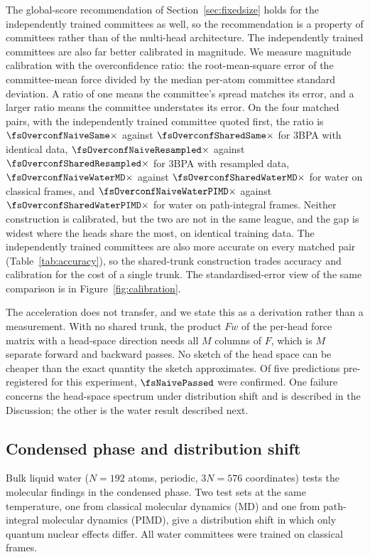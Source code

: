 The global-score recommendation of Section~\ref{sec:fixedsize} holds for the
independently trained committees as well, so the recommendation is a property
of committees rather than of the multi-head architecture. The independently
trained committees are also far better calibrated in magnitude. We measure
magnitude calibration with the overconfidence ratio: the root-mean-square error
of the committee-mean force divided by the median per-atom committee standard
deviation. A ratio of one means the committee's spread matches its error, and a
larger ratio means the committee understates its error. On the four matched
pairs, with the independently trained committee quoted first, the ratio is
$\fsOverconfNaiveSame\times$ against $\fsOverconfSharedSame\times$ for 3BPA
with identical data, $\fsOverconfNaiveResampled\times$ against
$\fsOverconfSharedResampled\times$ for 3BPA with resampled data,
$\fsOverconfNaiveWaterMD\times$ against $\fsOverconfSharedWaterMD\times$ for
water on classical frames, and $\fsOverconfNaiveWaterPIMD\times$ against
$\fsOverconfSharedWaterPIMD\times$ for water on path-integral frames. Neither
construction is calibrated, but the two are not in the same league, and the gap
is widest where the heads share the most, on identical training data. The
independently trained committees are also more accurate on every matched pair
(Table~\ref{tab:accuracy}), so the shared-trunk construction trades accuracy
and calibration for the cost of a single trunk. The standardised-error view of
the same comparison is in Figure~\ref{fig:calibration}.

The acceleration does not transfer, and we state this as a derivation rather
than a measurement. With no shared trunk, the product $Fw$ of the per-head force
matrix with a head-space direction needs all $M$ columns of $F$, which is $M$
separate forward and backward passes. No sketch of the head space can be
cheaper than the exact quantity the sketch approximates. Of five predictions
pre-registered for this experiment, $\fsNaivePassed$ were confirmed. One
failure concerns the head-space spectrum under distribution shift and is
described in the Discussion; the other is the water result described next.

\subsection{Condensed phase and distribution shift}
\label{sec:water}

Bulk liquid water ($N=192$ atoms, periodic, $3N=576$ coordinates) tests the
molecular findings in the condensed phase. Two test sets at the same temperature,
one from classical molecular dynamics (MD) and one from path-integral molecular
dynamics (PIMD), give a distribution shift in which only quantum nuclear effects
differ. All water committees were trained on classical frames.


